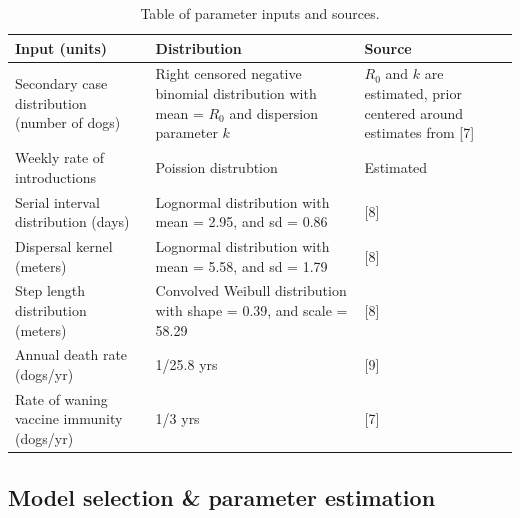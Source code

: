 \documentclass[
]{book}
\begin{document}
\begin{table}

\caption{\label{tab:tbinputs}Table of parameter inputs and sources.}
\centering
\begin{tabu} to 
\toprule
Input (units) & Distribution & Source\\
\midrule
Secondary case distribution (number of dogs) & Right censored negative binomial distribution with mean = $R_{0}$ and dispersion parameter $k$ & $R_{0}$ and $k$ are estimated, prior centered around estimates from {[}7{]}\\
Weekly rate of introductions & Poission distrubtion & Estimated\\
Serial interval distribution (days) & Lognormal distribution with mean = 2.95, and sd = 0.86 & {[}8{]}\\
Dispersal kernel (meters) & Lognormal distribution with mean = 5.58, and sd = 1.79 & {[}8{]}\\
Step length distribution (meters) & Convolved Weibull distribution with shape = 0.39, and scale = 58.29 & {[}8{]}\\
\addlinespace
Annual death rate (dogs/yr) & 1/25.8 yrs & {[}9{]}\\
Rate of waning vaccine immunity (dogs/yr) & 1/3 yrs & {[}7{]}\\
\bottomrule
\end{tabu}
\end{table}







\hypertarget{model-selection-parameter-estimation}{%
\subsection{Model selection \& parameter estimation}\label{model-selection-parameter-estimation}}
\end{document}
